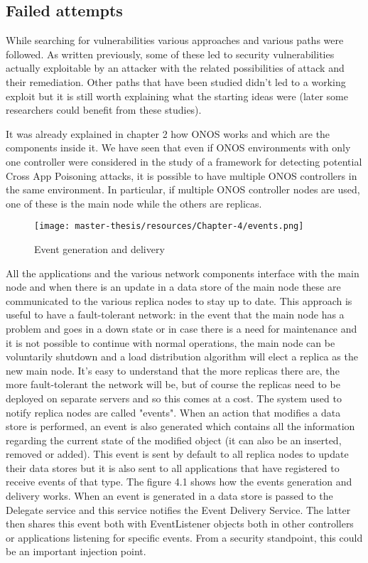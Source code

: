 \documentclass[a4paper,10pt]{memoir}
\begin{document}

\subsection{Failed attempts}
While searching for vulnerabilities various approaches and various paths were followed. As written previously, some of these led to security vulnerabilities actually exploitable by an attacker with the related possibilities of attack and their remediation. Other paths that have been studied didn't led to a working exploit but it is still worth explaining what the starting ideas were (later some researchers could benefit from these studies). 

It was already explained in chapter 2 how ONOS works and which are the components inside it. We have seen that even if ONOS environments with only one controller were considered in the study of a framework for detecting potential Cross App Poisoning attacks, it is possible to have multiple ONOS controllers in the same environment. In particular, if multiple ONOS controller nodes are used, one of these is the main node while the others are replicas. 
\begin{wrapfigure}[23]{l}{0.70\textwidth}
\caption{Event generation and delivery}
\label{fig:events}
\texttt{[image: master-thesis/resources/Chapter-4/events.png]}
\end{wrapfigure}
All the applications and the various network components interface with the main node and when there is an update in a data store of the main node these are communicated to the various replica nodes to stay up to date. This approach is useful to have a fault-tolerant network: in the event that the main node has a problem and goes in a down state or in case there is a need for maintenance and it is not possible to continue with normal operations, the main node can be voluntarily shutdown and a load distribution algorithm will elect a replica as the new main node. It's easy to understand that the more replicas there are, the more fault-tolerant the network will be, but of course the replicas need to be deployed on separate servers and so this comes at a cost. The system used to notify replica nodes are called "events". When an action that modifies a data store is performed, an event is also generated which contains all the information regarding the current state of the modified object (it can also be an inserted, removed or added). This event is sent by default to all replica nodes to update their data stores but it is also sent to all applications that have registered to receive events of that type. The figure 4.1 shows how the events generation and delivery works. When an event is generated in a data store is passed to the Delegate service and this service notifies the Event Delivery Service. The latter then shares this event both with EventListener objects both in other controllers or applications listening for specific events. From a security standpoint, this could be an important injection point.
\end{document}
